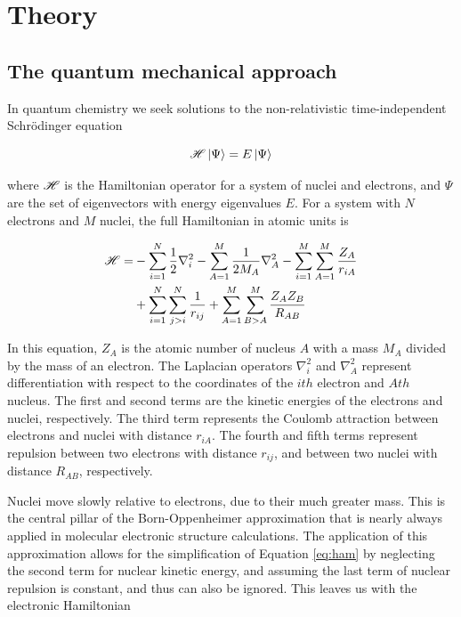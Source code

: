 
\chapter{Theory}
\label{ch:theory}

\section{The quantum mechanical approach}

In quantum chemistry we seek solutions to the non-relativistic time-independent
Schr{\"o}dinger equation

\begin{equation}
\mathscr{H} \ket{\Psi} = E \ket{\Psi}
\label{eq:schrodinger}
\end{equation}



\noindent where $\mathscr{H}$ is the Hamiltonian operator for a system of nuclei and
electrons, and $\Psi$ are the set of eigenvectors with energy eigenvalues
$E$.\cite{Griffiths2016} For a system with $N$ electrons and $M$ nuclei, the
full Hamiltonian in atomic units is

\begin{equation}
\begin{split}
\mathscr{H} = &-\sum_{i=1}^N \frac{1}{2}\nabla_i^2 - \sum_{A=1}^M\frac{1}{2M_A}\nabla_A^2
-\sum_{i=1}^M\sum_{A=1}^M\frac{Z_A}{r_{iA}} \\
&+ \sum_{i=1}^N\sum_{j>i}^N \frac{1}{r_{ij}} + \sum_{A=1}^M\sum_{B>A}^M
\frac{Z_AZ_B}{R_{AB}}
\label{eq:ham}
\end{split}
\end{equation}

\noindent In this equation, $Z_A$ is the atomic number of nucleus $A$ with a
mass $M_A$ divided by the mass of an electron. The Laplacian operators
$\nabla_i^2$ and $\nabla_A^2$ represent differentiation with respect to the
coordinates of the $ith$ electron and $Ath$ nucleus. The first and second terms
are the kinetic energies of the electrons and nuclei, respectively. The third
term represents the Coulomb attraction between electrons and nuclei with
distance $r_{iA}$. The fourth and fifth terms represent repulsion between two
electrons with distance $r_{ij}$, and between two nuclei with distance $R_{AB}$,
respectively.

Nuclei move slowly relative to electrons, due to their much greater mass. This
is the central pillar of the Born-Oppenheimer approximation that is nearly
always applied in molecular electronic structure calculations. The application
of this approximation allows for the simplification of Equation \ref{eq:ham} by
neglecting the second term for nuclear kinetic energy, and assuming the last
term of nuclear repulsion is constant, and thus can also be ignored. This leaves
us with the electronic Hamiltonian

